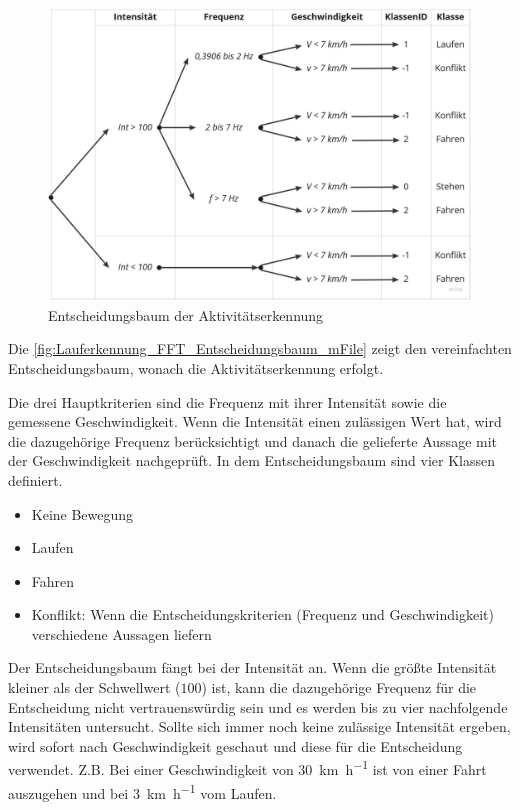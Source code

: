\begin{figure}
	\centering
	\includegraphics[width=\linewidth]{Bilder/Entscheidungsbaum_mFile.pdf}
	\caption{Entscheidungsbaum der Aktivitätserkennung}
	\label{fig:Lauferkennung_FFT_Entscheidungsbaum_mFile}
\end{figure}

Die \autoref{fig:Lauferkennung_FFT_Entscheidungsbaum_mFile} zeigt den vereinfachten Entscheidungsbaum, wonach die Aktivitäts\-erkennung erfolgt.

Die drei Hauptkriterien sind die Frequenz mit ihrer Intensität sowie die gemessene Geschwindigkeit. Wenn die Intensität einen zulässigen Wert hat, wird die dazugehörige Frequenz berücksichtigt und danach die gelieferte Aussage mit der Geschwindigkeit nachgeprüft.
In dem Entscheidungsbaum sind vier Klassen definiert.
\begin{itemize}
	\item Keine Bewegung
	\item Laufen
	\item Fahren
	\item Konflikt: Wenn die Entscheidungskriterien (Frequenz und Geschwindigkeit) verschiedene Aussagen liefern
\end{itemize}
Der Entscheidungsbaum fängt bei der Intensität an. Wenn die größte Intensität kleiner als der Schwellwert ($100$) ist, kann die dazugehörige Frequenz für die Entscheidung nicht vertrauenswürdig sein und es werden bis zu vier nachfolgende Intensitäten untersucht. Sollte sich immer noch keine zulässige Intensität ergeben, wird sofort nach Geschwindigkeit geschaut und diese für die Entscheidung verwendet.
Z.B. Bei einer Geschwindigkeit von \SI[per-mode = symbol]{30}{\kilo\meter\per\hour} ist von einer Fahrt auszugehen und bei \SI[per-mode = symbol]{3}{\kilo\meter\per\hour} vom Laufen.

